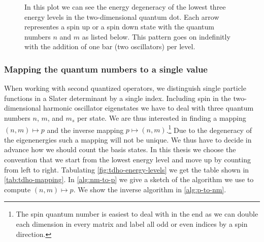 \begin{figure}
\begin{center}
                \end{center}
                \caption{In this plot we can see the energy degeneracy of the lowest
                three energy levels in the two-dimensional quantum dot.
                Each arrow representes a spin up or a spin down state with the
                quantum numbers $n$ and $m$ as listed below.
                This pattern goes on indefinitly with the addition of one bar
                (two oscillators) per level.}
                \label{fig:tdho-energy-levels}
            \end{figure}


        \subsubsection{Mapping the quantum numbers to a single value}
            When working with second quantized operators, we distinguish single
            particle functions in a Slater determinant by a single index.
            Including spin in the two-dimensional harmonic oscillator
            eigenstates we have to deal with three quantum numbers $n$, $m$, and
            $m_s$ per state.
            We are thus interested in finding a mapping $(n, m) \mapsto p$ and
            the inverse mapping $p \mapsto (n, m)$.\footnote{%
                The spin quantum number is easiest to deal with in the end as we
                can double each dimension in every matrix and label all odd or
                even indices by a spin direction.
            }
            Due to the degeneracy of the eigenenergies such a mapping will not
            be unique.
            We thus have to decide in advance how we should count the basis
            states.
            In this thesis we choose the convention that we start from the
            lowest energy level and move up by counting from left to right.
            Tabulating \autoref{fig:tdho-energy-levels} we get the table shown
            in \autoref{tab:tdho-mapping}.
            In \autoref{alg:nm-to-p} we give a sketch of the algorithm we use to
            compute $(n, m) \mapsto p$. We show the inverse algorithm in
            \autoref{alg:p-to-nm}.

